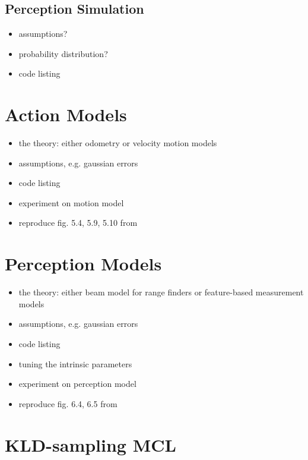 \documentclass[letterpaper, 10 pt, conference]{ieeeconf}  %
\begin{document}
\subsection{Perception Simulation}
\begin{itemize}
\item assumptions?
\item probability distribution?
\item code listing
\end{itemize}

\section{Action Models}
\begin{itemize}
    \item the theory: either odometry or velocity motion models
    \item assumptions, e.g. gaussian errors
    \item code listing
    \item experiment on motion model
    \item reproduce fig. 5.4, 5.9, 5.10 from~\cite{Thrun:2005:PR}
\end{itemize}

\section{Perception Models}
\begin{itemize}
    \item the theory: either beam model for range finders or feature-based measurement models
    \item assumptions, e.g. gaussian errors
    \item code listing
    \item tuning the intrinsic parameters
    \item experiment on perception model
    \item reproduce fig. 6.4, 6.5 from~\cite{Thrun:2005:PR}
\end{itemize}

\section{KLD-sampling MCL}
\end{document}
